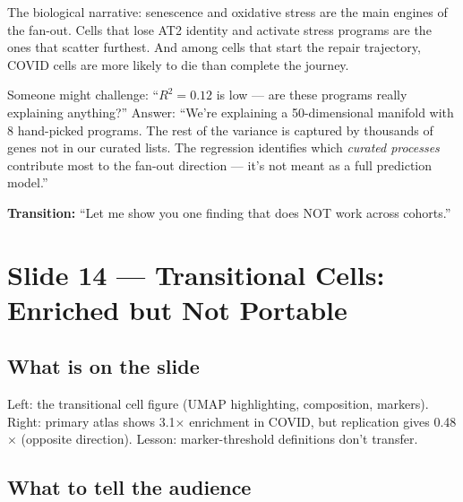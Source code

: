 \documentclass[11pt]{article}
\begin{document}
\begin{resultbox}
The biological narrative: senescence and oxidative stress are the main engines of the fan-out. Cells that lose AT2 identity and activate stress programs are the ones that scatter furthest. And among cells that start the repair trajectory, COVID cells are more likely to die than complete the journey.
\end{resultbox}

\begin{pitfall}
Someone might challenge: ``$R^2 = 0.12$ is low --- are these programs really explaining anything?'' Answer: ``We're explaining a 50-dimensional manifold with 8 hand-picked programs. The rest of the variance is captured by thousands of genes not in our curated lists. The regression identifies which \emph{curated processes} contribute most to the fan-out direction --- it's not meant as a full prediction model.''
\end{pitfall}

\textbf{Transition:} ``Let me show you one finding that does NOT work across cohorts.''


\section{Slide 14 --- Transitional Cells: Enriched but Not Portable}

\subsection{What is on the slide}

Left: the transitional cell figure (UMAP highlighting, composition, markers). Right: primary atlas shows 3.1$\times$ enrichment in COVID, but replication gives 0.48$\times$ (opposite direction). Lesson: marker-threshold definitions don't transfer.

\subsection{What to tell the audience}
\end{document}
